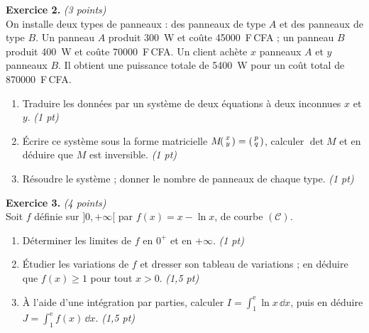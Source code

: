 \smallskip
\noindent\textbf{Exercice 2.} \hfill\textit{(3 points)}\\
On installe deux types de panneaux : des panneaux de type $A$ et des panneaux de type $B$.
Un panneau $A$ produit \SI{300}{\watt} et coûte \num{45000}~F\,CFA ; un panneau $B$ produit
\SI{400}{\watt} et coûte \num{70000}~F\,CFA. Un client achète $x$ panneaux $A$ et $y$ panneaux $B$.
Il obtient une puissance totale de \SI{5400}{\watt} pour un coût total de \num{870000}~F\,CFA.
\begin{enumerate}[label=\arabic*)]
\item Traduire les données par un système de deux équations à deux inconnues $x$ et $y$. \hfill\textit{(1 pt)}
\item Écrire ce système sous la forme matricielle $M\!\begin{psmallmatrix}x\\y\end{psmallmatrix}=\begin{psmallmatrix}p\\q\end{psmallmatrix}$,
calculer $\det M$ et en déduire que $M$ est inversible. \hfill\textit{(1 pt)}
\item Résoudre le système ; donner le nombre de panneaux de chaque type. \hfill\textit{(1 pt)}
\end{enumerate}

\smallskip
\noindent\textbf{Exercice 3.} \hfill\textit{(4 points)}\\
Soit $f$ définie sur $]0,+\infty[$ par $f(x)=x-\ln x$, de courbe $(\mathcal{C})$.
\begin{enumerate}[label=\arabic*)]
\item Déterminer les limites de $f$ en $0^+$ et en $+\infty$. \hfill\textit{(1 pt)}
\item Étudier les variations de $f$ et dresser son tableau de variations ; en déduire que
$f(x)\ge 1$ pour tout $x>0$. \hfill\textit{(1,5 pt)}
\item À l'aide d'une intégration par parties, calculer
$\displaystyle I=\int_1^{\mathrm e}\ln x\,\dd x$, puis en déduire
$\displaystyle J=\int_1^{\mathrm e}f(x)\,\dd x$. \hfill\textit{(1,5 pt)}
\end{enumerate}

